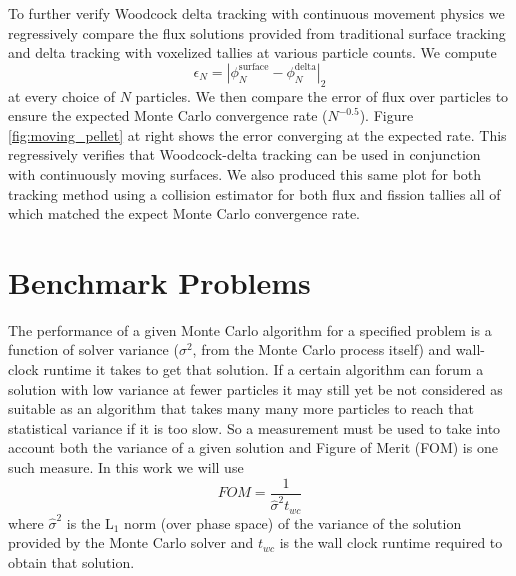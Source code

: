 To further verify Woodcock delta tracking with continuous movement physics we regressively compare the flux solutions provided from traditional surface tracking and delta tracking with voxelized tallies at various particle counts.
We compute 
\begin{equation}
    \epsilon_N = |\phi_N^{\text{surface}} - \phi_N^{\text{delta}} |_2
\end{equation}
at every choice of $N$ particles.
We then compare the error of flux over particles to ensure the expected Monte Carlo convergence rate ($N^{-0.5}$).
Figure \ref{fig:moving_pellet} at right shows the error converging at the expected rate.
This regressively verifies that Woodcock-delta tracking can be used in conjunction with continuously moving surfaces.
We also produced this same plot for both tracking method using a collision estimator for both flux and fission tallies all of which matched the expect Monte Carlo convergence rate.

\section{Benchmark Problems}
\label{sec:benchmarks}

The performance of a given Monte Carlo algorithm for a specified problem is a function of solver variance ($\sigma^2$, from the Monte Carlo process itself) and wall-clock runtime it takes to get that solution.
If a certain algorithm can forum a solution with low variance at fewer particles it may still yet be not considered as suitable as an algorithm that takes many many more particles to reach that statistical variance if it is too slow.
So a measurement must be used to take into account both the variance of a given solution and Figure of Merit (FOM) is one such measure. In this work we will use 
\begin{equation}
    FOM = \frac{1}{\hat{\sigma}^2 t_{wc}}
\end{equation}
where $\hat{\sigma}^2$ is the L$_{1}$ norm (over phase space) of the variance of the solution provided by the Monte Carlo solver and $t_{wc}$ is the wall clock runtime required to obtain that solution.

